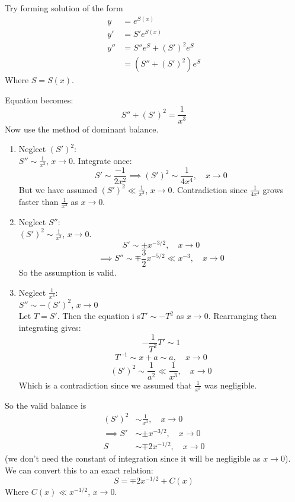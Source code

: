 \documentclass{X:/Documents/Coding/Latex/myassignment}
\begin{document}
Try forming solution of the form
\begin{align*}
	y&=e^{S(x)}\\
	y'&=S' e^{S(x)}\\
	y''&= S'' e^{S} + (S')^2 e^S\\
	&= (S'' + (S')^2)e^S
\end{align*}
Where $S = S(x)$.

Equation becomes:
\[S'' + (S')^2 = \frac{1}{x^3}\]
Now use the method of dominant balance.

\begin{enumerate}
	\item Neglect $(S')^2$:\\
	$S'' \sim \frac{1}{x^3}$, $x\to 0$.
	Integrate once:
	\[S' \sim \frac{-1}{2x^2} \implies (S')^2 \sim \frac{1}{4x^4}, \quad x\to 0\]
	But we have assumed $(S')^2 \ll \frac{1}{x^3}$, $x\to 0$. Contradiction since $\frac{1}{4x^4}$ grows faster than $\frac{1}{x^3}$ as $x\to 0$.

	\item Neglect $S''$:\\
	$(S')^2 \sim \frac{1}{x^3}$, $x\to 0$.
	\[S' \sim \pm x^{-3/2}, \quad x\to 0\]
	\[\implies S'' \sim \mp \frac32 x^{-5/2} \ll x^{-3}, \quad x\to 0\]
	So the assumption is valid.\\


	\item Neglect $\frac{1}{x^3}$:\\
	$S'' \sim -(S')^2$, $x\to 0$\\
	Let $T= S'$. Then the equation i s$T' \sim -T^2$ as $x\to 0$. Rearranging then integrating gives:
	\[-\frac1{T^2} T' \sim 1\]
	\[T^{-1} \sim x+a \sim a, \quad x\to 0 \]
	\[(S')^2 \sim \frac{1}{a^2} \ll \frac{1}{x^3},\quad x\to 0\]
	Which is a contradiction since we assumed that $\frac{1}{x^3}$ was negligible.

\end{enumerate}


So the valid balance is
\begin{align*}
	(S')^2 &\sim \frac{1}{x^3}, \quad x\to 0\\
	\implies S' &\sim \pm x^{-3/2}, \quad x\to 0\\
	S &\sim \mp 2x^{-1/2}, \quad x\to 0
\end{align*}
(we don't need the constant of integration since it will be negligible as $x\to 0$).\\

We can convert this to an exact relation:
	\[S = \mp 2x^{-1/2} + C(x)\]
Where $C(x) \ll x^{-1/2}$, $x\to 0$.\\
\end{document}

